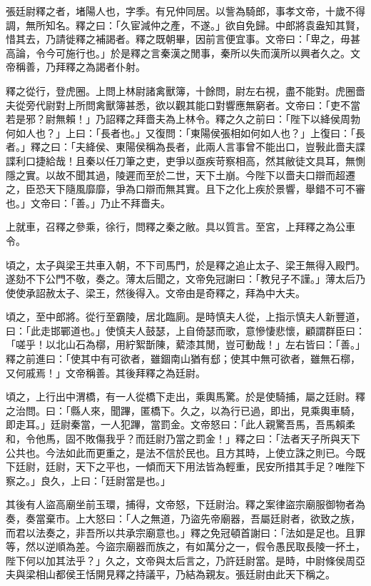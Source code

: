
\begin{pinyinscope}
張廷尉釋之者，堵陽人也，字季。有兄仲同居。以訾為騎郎，事孝文帝，十歲不得調，無所知名。釋之曰：「久宦減仲之產，不遂。」欲自免歸。中郎將袁盎知其賢，惜其去，乃請徙釋之補謁者。釋之既朝畢，因前言便宜事。文帝曰：「卑之，毋甚高論，令今可施行也。」於是釋之言秦漢之閒事，秦所以失而漢所以興者久之。文帝稱善，乃拜釋之為謁者仆射。

釋之從行，登虎圈。上問上林尉諸禽獸簿，十餘問，尉左右視，盡不能對。虎圈嗇夫從旁代尉對上所問禽獸簿甚悉，欲以觀其能口對響應無窮者。文帝曰：「吏不當若是邪？尉無賴！」乃詔釋之拜嗇夫為上林令。釋之久之前曰：「陛下以絳侯周勃何如人也？」上曰：「長者也。」又復問：「東陽侯張相如何如人也？」上復曰：「長者。」釋之曰：「夫絳侯、東陽侯稱為長者，此兩人言事曾不能出口，豈斅此嗇夫諜諜利口捷給哉！且秦以任刀筆之吏，吏爭以亟疾苛察相高，然其敝徒文具耳，無惻隱之實。以故不聞其過，陵遲而至於二世，天下土崩。今陛下以嗇夫口辯而超遷之，臣恐天下隨風靡靡，爭為口辯而無其實。且下之化上疾於景響，舉錯不可不審也。」文帝曰：「善。」乃止不拜嗇夫。

上就車，召釋之參乘，徐行，問釋之秦之敝。具以質言。至宮，上拜釋之為公車令。

頃之，太子與梁王共車入朝，不下司馬門，於是釋之追止太子、梁王無得入殿門。遂劾不下公門不敬，奏之。薄太后聞之，文帝免冠謝曰：「教兒子不謹。」薄太后乃使使承詔赦太子、梁王，然後得入。文帝由是奇釋之，拜為中大夫。

頃之，至中郎將。從行至霸陵，居北臨廁。是時慎夫人從，上指示慎夫人新豐道，曰：「此走邯鄲道也。」使慎夫人鼓瑟，上自倚瑟而歌，意慘悽悲懷，顧謂群臣曰：「嗟乎！以北山石為槨，用紵絮斮陳，蕠漆其閒，豈可動哉！」左右皆曰：「善。」釋之前進曰：「使其中有可欲者，雖錮南山猶有郄；使其中無可欲者，雖無石槨，又何戚焉！」文帝稱善。其後拜釋之為廷尉。

頃之，上行出中渭橋，有一人從橋下走出，乘輿馬驚。於是使騎捕，屬之廷尉。釋之治問。曰：「縣人來，聞蹕，匿橋下。久之，以為行已過，即出，見乘輿車騎，即走耳。」廷尉秦當，一人犯蹕，當罰金。文帝怒曰：「此人親驚吾馬，吾馬賴柔和，令他馬，固不敗傷我乎？而廷尉乃當之罰金！」釋之曰：「法者天子所與天下公共也。今法如此而更重之，是法不信於民也。且方其時，上使立誅之則已。今既下廷尉，廷尉，天下之平也，一傾而天下用法皆為輕重，民安所措其手足？唯陛下察之。」良久，上曰：「廷尉當是也。」

其後有人盜高廟坐前玉環，捕得，文帝怒，下廷尉治。釋之案律盜宗廟服御物者為奏，奏當棄市。上大怒曰：「人之無道，乃盜先帝廟器，吾屬廷尉者，欲致之族，而君以法奏之，非吾所以共承宗廟意也。」釋之免冠頓首謝曰：「法如是足也。且罪等，然以逆順為差。今盜宗廟器而族之，有如萬分之一，假令愚民取長陵一抔土，陛下何以加其法乎？」久之，文帝與太后言之，乃許廷尉當。是時，中尉條侯周亞夫與梁相山都侯王恬開見釋之持議平，乃結為親友。張廷尉由此天下稱之。


\end{pinyinscope}
